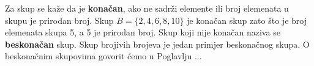 \documentclass[a4paper, 14pt]{article}
\begin{document}

Za skup se kaže da je \textbf{konačan}, ako ne sadrži elemente ili broj elemenata u skupu je prirodan broj. Skup $B=\{2, 4, 6, 8, 10\}$ je konačan skup zato što je broj elemenata skupa 5, a 5 je prirodan broj. Skup koji nije konačan naziva se \textbf{beskonačan} skup. Skup brojivih brojeva je jedan primjer beskonačnog skupa. O beskonačnim skupovima govorit ćemo u Poglavlju ...
\newpage
\end{document}
